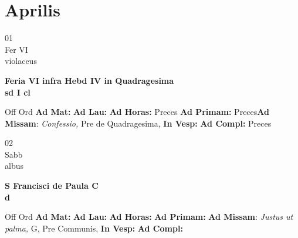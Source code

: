 \documentclass[10pt, openany]{book}
\begin{document}
        \chapter{Aprilis}
                        
        \begin{center}
            \begin{minipage}{3.5in}
                \vspace{2em}
                \begin{minipage}{0.5in}
                    {\Huge 01} \\
                    {\normalsize Fer VI} \\
                    {\normalsize violaceus}
                \end{minipage}
                \begin{minipage}{3.0in}
                    \textbf{ \large Feria VI infra Hebd IV in Quadragesima  \\
                    \textnormal{\normalsize sd I cl}} \\ 
                \end{minipage}
                \begin{justify}Off Ord
                    \textbf{Ad Mat: }
                    \textbf{Ad Lau: }
                    \textbf{Ad Horas: }Preces
                    \textbf{Ad Primam: }Preces\textbf{Ad Missam}: \textit{Confessio,} Pre de Quadragesima,  
                    \textbf{In Vesp: }
                    \textbf{Ad Compl: }Preces
                \end{justify}
            \end{minipage}
        \end{center}
    
        \begin{center}
            \begin{minipage}{3.5in}
                \vspace{2em}
                \begin{minipage}{0.5in}
                    {\Huge 02} \\
                    {\normalsize Sabb} \\
                    {\normalsize albus}
                \end{minipage}
                \begin{minipage}{3.0in}
                    \textbf{ \large S Francisci de Paula C \\
                    \textnormal{\normalsize d}} \\ 
                \end{minipage}
                \begin{justify}Off Ord
                    \textbf{Ad Mat: }
                    \textbf{Ad Lau: }
                    \textbf{Ad Horas: }
                    \textbf{Ad Primam: }\textbf{Ad Missam}: \textit{Justus ut palma,} G, Pre Communis,  
                    \textbf{In Vesp: }
                    \textbf{Ad Compl: }
                \end{justify}
            \end{minipage}
        \end{center}
    
\end{document}
